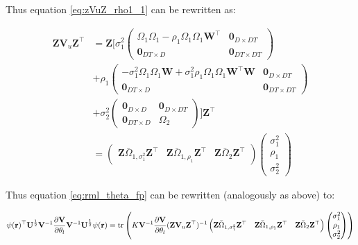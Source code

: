 Thus equation \ref{eq:zVuZ_rho1_1} can be rewritten as:

\begin{align*}
\mathbf{Z}\mathbf{V}_u\mathbf{Z}^\top
&=\mathbf{Z}
\Biggr[
\sigma_1^2\left(\begin{matrix}
\Omega_1\Omega_1 -\rho_1\Omega_1\Omega_1\mathbf{W}^\top & \mathbf{0}_{D\times DT}\\
\mathbf{0}_{DT\times D} &  \mathbf{0}_{DT\times DT}
\end{matrix}\right)\\
&+\rho_1\left(\begin{matrix}
-\sigma_1^2\Omega_1\Omega_1\mathbf{W} + \sigma_1^2\rho_1\Omega_1\Omega_1\mathbf{W}^\top\mathbf{W} & \mathbf{0}_{D\times DT}\\
\mathbf{0}_{DT\times D} &  \mathbf{0}_{DT\times DT}
\end{matrix}\right)\\
&+\sigma_2^2\left(\begin{matrix}
\mathbf{0}_{D\times D} & \mathbf{0}_{D\times DT}\\
\mathbf{0}_{DT\times D} & \Omega_2
\end{matrix}\right)
\Biggr]
\mathbf{Z}^\top \\
&=\left(\begin{matrix}\mathbf{Z}\bar{\Omega}_{1, \sigma_1^2}\mathbf{Z}^\top & 
\mathbf{Z}\bar{\Omega}_{1, \rho_1}\mathbf{Z}^\top & \mathbf{Z}\bar{\Omega}_2\mathbf{Z}^\top\end{matrix}\right)
\left(\begin{matrix}
\sigma_1^2 \\
\rho_1 \\
\sigma_2^2
\end{matrix}\right)
\end{align*}

Thus equation \ref{eq:rml_theta_fp} can be rewritten (analogously as
above) to:

\begin{eqnarray*}
\psi(\mathbf{r})^\top\mathbf{U}^{\frac{1}{2}}\mathbf{V}^{-1}\frac{\partial\mathbf{V}}{\partial\theta_l}\mathbf{V}^{-1}\mathbf{U}^{\frac{1}{2}} \psi(\mathbf{r}) = \operatorname{tr}\left(K\mathbf{V}^{-1}\frac{\partial\mathbf{V}}{\partial\theta_l} (\mathbf{Z}\mathbf{V}_u\mathbf{Z}^\top)^{-1} \left(\begin{matrix}\mathbf{Z}\bar{\Omega}_{1, \sigma_1^2}\mathbf{Z}^\top & 
\mathbf{Z}\bar{\Omega}_{1, \rho_1}\mathbf{Z}^\top & \mathbf{Z}\bar{\Omega}_2\mathbf{Z}^\top\end{matrix}\right)
\left(\begin{matrix}
\sigma_1^2 \\
\rho_1 \\
\sigma_2^2
\end{matrix}\right)\right)
\end{eqnarray*}

